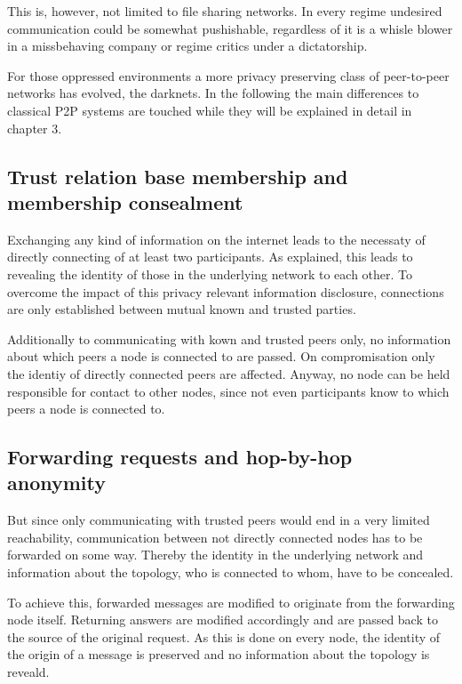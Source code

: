 This is, however, not limited to file sharing networks. In every regime undesired communication could be somewhat pushishable, regardless of it is a whisle blower in a missbehaving company or regime critics under a dictatorship. 

For those oppressed environments a more privacy preserving class of peer-to-peer networks has evolved, the darknets. In the following the main differences to classical P2P systems are touched while they will be explained in detail in chapter 3.


\subsection{Trust relation base membership and membership consealment}

Exchanging any kind of information on the internet leads to the necessaty of directly connecting of at least two participants. As explained, this leads to revealing the identity of those in the underlying network to each other. To overcome the impact of this privacy relevant information disclosure, connections are only established between mutual known and trusted parties.

Additionally to communicating with kown and trusted peers only, no information about which peers a node is connected to are passed. On compromisation only the identiy of directly connected peers are affected. Anyway, no node can be held responsible for contact to other nodes, since not even participants know to which peers a node is connected to.

\subsection{Forwarding requests and hop-by-hop anonymity}

But since only communicating with trusted peers would end in a very limited reachability, communication between not directly connected nodes has to be forwarded on some way. Thereby the identity in the underlying network and information about the topology, who is connected to whom, have to be concealed.

To achieve this, forwarded messages are modified to originate from the forwarding node itself. Returning answers are modified accordingly and are passed back to the source of the original request. As this is done on every node, the identity of the origin of a message is preserved and no information about the topology is reveald.



